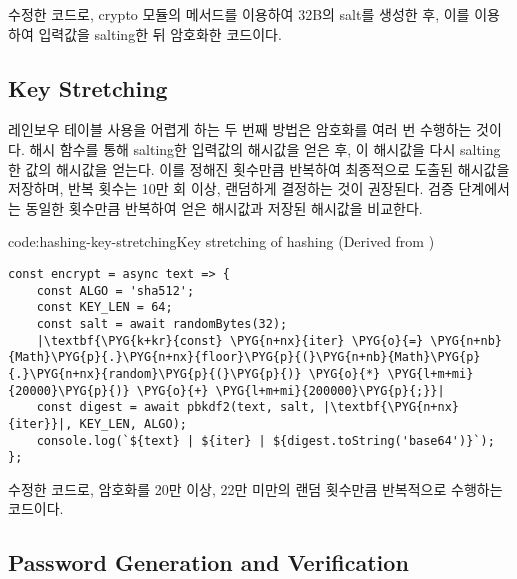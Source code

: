 \은 \을 수정한 코드로, crypto 모듈의  메서드를 이용하여 32B의 salt를 생성한 후, 이를 이용하여 입력값을 salting한 뒤 암호화한 코드이다.

\subsection*{Key Stretching}

레인보우 테이블 사용을 어렵게 하는 두 번째 방법은 암호화를 여러 번 수행하는 것이다. 해시 함수를 통해 salting한 입력값의 해시값을 얻은 후, 이 해시값을 다시 salting한 값의 해시값을 얻는다. 이를 정해진 횟수만큼 반복하여 최종적으로 도출된 해시값을 저장하며, 반복 횟수는 10만 회 이상, 랜덤하게 결정하는 것이 권장된다. 검증 단계에서는 동일한 횟수만큼 반복하여 얻은 해시값과 저장된 해시값을 비교한다.

\begin{code}{code:hashing-key-stretching}{Key stretching of hashing (Derived from )}
\begin{verbatim}
const encrypt = async text => {
    const ALGO = 'sha512';
    const KEY_LEN = 64;
    const salt = await randomBytes(32);
    |\textbf{\PYG{k+kr}{const} \PYG{n+nx}{iter} \PYG{o}{=} \PYG{n+nb}{Math}\PYG{p}{.}\PYG{n+nx}{floor}\PYG{p}{(}\PYG{n+nb}{Math}\PYG{p}{.}\PYG{n+nx}{random}\PYG{p}{(}\PYG{p}{)} \PYG{o}{*} \PYG{l+m+mi}{20000}\PYG{p}{)} \PYG{o}{+} \PYG{l+m+mi}{200000}\PYG{p}{;}}|
    const digest = await pbkdf2(text, salt, |\textbf{\PYG{n+nx}{iter}}|, KEY_LEN, ALGO);
    console.log(`${text} | ${iter} | ${digest.toString('base64')}`);
};
\end{verbatim}
\end{code}


\은 \을 수정한 코드로, 암호화를 20만 이상, 22만 미만의 랜덤 횟수만큼 반복적으로 수행하는 코드이다.

\subsection*{Password Generation and Verification}

